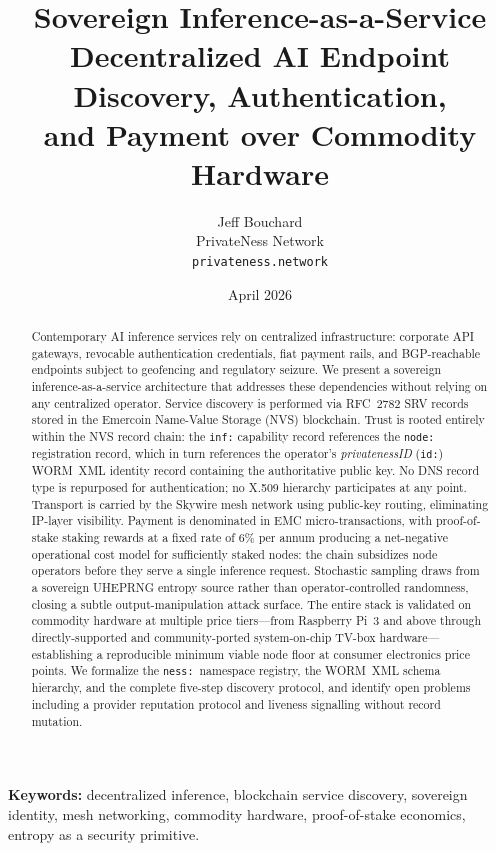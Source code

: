 \documentclass[11pt,a4paper]{article}
\title{\textbf{Sovereign Inference-as-a-Service}\\[0.4em]
  \large Decentralized AI Endpoint Discovery, Authentication,\\
  and Payment over Commodity Hardware}
\author{
  Jeff Bouchard\\
  PrivateNess Network\\
  \texttt{privateness.network}
}
\date{April 2026}
\theoremstyle{definition}
\begin{document}
\maketitle
\thispagestyle{fancy}

\begin{abstract}
Contemporary AI inference services rely on centralized infrastructure: corporate
API gateways, revocable authentication credentials, fiat payment rails, and
BGP-reachable endpoints subject to geofencing and regulatory seizure.  We present
a sovereign inference-as-a-service architecture that addresses these
dependencies without relying on any centralized operator.  Service discovery is performed via RFC~2782 SRV records
stored in the Emercoin Name-Value Storage (NVS) blockchain.  Trust is rooted
entirely within the NVS record chain: the \texttt{inf:} capability record
references the \texttt{node:} registration record, which in turn references
the operator's \emph{privatenessID} (\texttt{id:}) WORM~XML identity record
containing the authoritative public key.  No DNS record type is repurposed
for authentication; no X.509 hierarchy participates at any point.  Transport
is carried by the Skywire mesh network using public-key routing, eliminating
IP-layer visibility.  Payment is denominated in EMC micro-transactions, with
proof-of-stake staking rewards at a fixed rate of 6\% per annum producing a
net-negative operational cost model for sufficiently staked nodes:
the chain subsidizes node operators before they serve a single inference request.
Stochastic sampling draws from a sovereign UHEPRNG entropy source rather than
operator-controlled randomness, closing a subtle output-manipulation attack
surface.  The entire stack is validated on commodity hardware at multiple price
tiers---from Raspberry Pi~3 and above through directly-supported and
community-ported system-on-chip TV-box hardware---establishing a reproducible
minimum viable node floor at consumer electronics price points.  We formalize the
\texttt{ness:}~namespace registry, the WORM~XML schema hierarchy, and the
complete five-step discovery protocol, and identify open problems including a
provider reputation protocol and liveness signalling without record mutation.
\end{abstract}

\vspace{1em}
\noindent\textbf{Keywords:} decentralized inference, blockchain service discovery,
sovereign identity, mesh networking, commodity hardware, proof-of-stake economics,
entropy as a security primitive.
\end{document}
